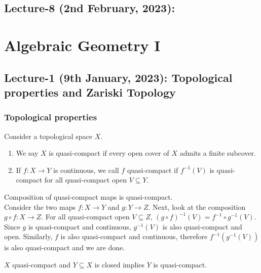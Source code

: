 \documentclass[oneside, 12pt, ]{scrbook}
\theoremstyle{theorem}
\begin{document}
\chapter{Lecture-8 (2nd February, 2023): }









\part{Algebraic Geometry I}

\chapter{Lecture-1 (9th January, 2023): Topological properties and Zariski Topology}
\section{Topological properties}

Consider a topological space $X$. 
\begin{definition}
\begin{enumerate}
\item We say $X$ is quasi-compact if every open cover of $X$ admits a finite subcover. 
\item If $f: X \rightarrow Y$ is continuous, we call $f$ quasi-compact if $f^{-1}(V)$ is quasi-compact for all quasi-compact open $V \subseteq Y$.
\end{enumerate}
\end{definition} 

\begin{exercise}
Composition of quasi-compact maps is quasi-compact.\\

Consider the two maps $f: X \rightarrow Y$ and $g: Y \rightarrow Z$. Next, look at the composition $g \circ f : X \rightarrow Z$. For all quasi-compact open $V \subseteq Z$, $(g \circ f)^{-1} (V) = f^{-1} \circ g^{-1} (V)$. Since $g$ is quasi-compact and continuous, $g^{-1}(V)$ is also quasi-compact and open. Similarly, $f$ is also quasi-compact and continuous, therefore $f^{-1}(g^{-1}(V))$ is also quasi-compact and we are done.
\end{exercise} 

\begin{lemma}
$X$ quasi-compact and $Y \subseteq X$ is closed implies $Y$ is quasi-compact.
\end{lemma}
\end{document}

